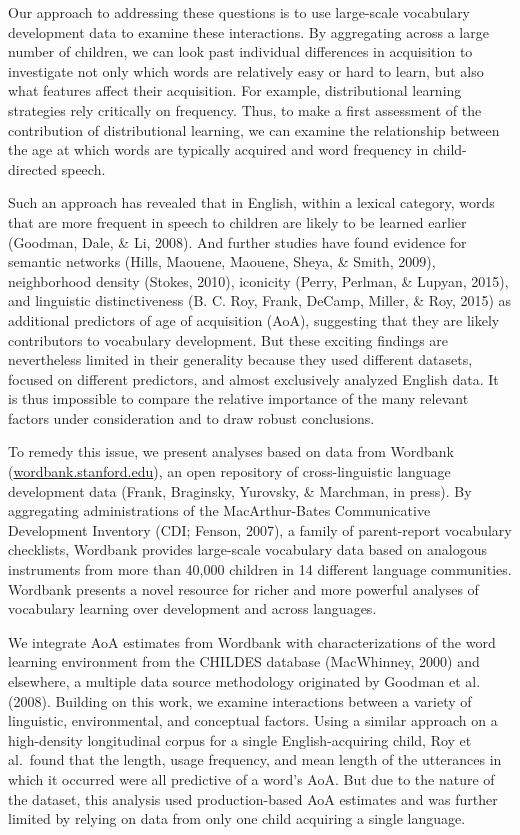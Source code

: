 \documentclass[10pt, letterpaper]{article}
\begin{document}
Our approach to addressing these questions is to use large-scale
vocabulary development data to examine these interactions. By
aggregating across a large number of children, we can look past
individual differences in acquisition to investigate not only which
words are relatively easy or hard to learn, but also what features
affect their acquisition. For example, distributional learning
strategies rely critically on frequency. Thus, to make a first
assessment of the contribution of distributional learning, we can
examine the relationship between the age at which words are typically
acquired and word frequency in child-directed speech.

Such an approach has revealed that in English, within a lexical
category, words that are more frequent in speech to children are likely
to be learned earlier (Goodman, Dale, \& Li, 2008). And further studies
have found evidence for semantic networks (Hills, Maouene, Maouene,
Sheya, \& Smith, 2009), neighborhood density (Stokes, 2010), iconicity
(Perry, Perlman, \& Lupyan, 2015), and linguistic distinctiveness (B. C.
Roy, Frank, DeCamp, Miller, \& Roy, 2015) as additional predictors of
age of acquisition (AoA), suggesting that they are likely contributors
to vocabulary development. But these exciting findings are nevertheless
limited in their generality because they used different datasets,
focused on different predictors, and almost exclusively analyzed English
data. It is thus impossible to compare the relative importance of the
many relevant factors under consideration and to draw robust
conclusions.

To remedy this issue, we present analyses based on data from Wordbank
(\href{http://wordbank.stanford.edu}{wordbank.stanford.edu}), an open
repository of cross-linguistic language development data (Frank,
Braginsky, Yurovsky, \& Marchman, in press). By aggregating
administrations of the MacArthur-Bates Communicative Development
Inventory (CDI; Fenson, 2007), a family of parent-report vocabulary
checklists, Wordbank provides large-scale vocabulary data based on
analogous instruments from more than 40,000 children in 14 different
language communities. Wordbank presents a novel resource for richer and
more powerful analyses of vocabulary learning over development and
across languages.

We integrate AoA estimates from Wordbank with characterizations of the
word learning environment from the CHILDES database (MacWhinney, 2000)
and elsewhere, a multiple data source methodology originated by Goodman
et al. (2008). Building on this work, we examine interactions between a
variety of linguistic, environmental, and conceptual factors. Using a
similar approach on a high-density longitudinal corpus for a single
English-acquiring child, Roy et al.~found that the length, usage
frequency, and mean length of the utterances in which it occurred were
all predictive of a word's AoA. But due to the nature of the dataset,
this analysis used production-based AoA estimates and was further
limited by relying on data from only one child acquiring a single
language.
\end{document}
